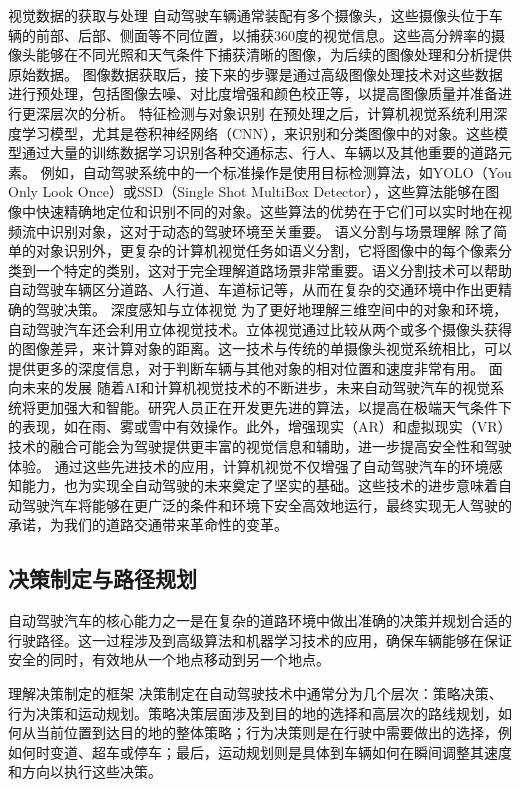 视觉数据的获取与处理
自动驾驶车辆通常装配有多个摄像头，这些摄像头位于车辆的前部、后部、侧面等不同位置，以捕获360度的视觉信息。这些高分辨率的摄像头能够在不同光照和天气条件下捕获清晰的图像，为后续的图像处理和分析提供原始数据。
图像数据获取后，接下来的步骤是通过高级图像处理技术对这些数据进行预处理，包括图像去噪、对比度增强和颜色校正等，以提高图像质量并准备进行更深层次的分析。
特征检测与对象识别
在预处理之后，计算机视觉系统利用深度学习模型，尤其是卷积神经网络（CNN），来识别和分类图像中的对象。这些模型通过大量的训练数据学习识别各种交通标志、行人、车辆以及其他重要的道路元素。
例如，自动驾驶系统中的一个标准操作是使用目标检测算法，如YOLO（You Only Look Once）或SSD（Single Shot MultiBox Detector），这些算法能够在图像中快速精确地定位和识别不同的对象。这些算法的优势在于它们可以实时地在视频流中识别对象，这对于动态的驾驶环境至关重要。
语义分割与场景理解
除了简单的对象识别外，更复杂的计算机视觉任务如语义分割，它将图像中的每个像素分类到一个特定的类别，这对于完全理解道路场景非常重要。语义分割技术可以帮助自动驾驶车辆区分道路、人行道、车道标记等，从而在复杂的交通环境中作出更精确的驾驶决策。
深度感知与立体视觉
为了更好地理解三维空间中的对象和环境，自动驾驶汽车还会利用立体视觉技术。立体视觉通过比较从两个或多个摄像头获得的图像差异，来计算对象的距离。这一技术与传统的单摄像头视觉系统相比，可以提供更多的深度信息，对于判断车辆与其他对象的相对位置和速度非常有用。
面向未来的发展
随着AI和计算机视觉技术的不断进步，未来自动驾驶汽车的视觉系统将更加强大和智能。研究人员正在开发更先进的算法，以提高在极端天气条件下的表现，如在雨、雾或雪中有效操作。此外，增强现实（AR）和虚拟现实（VR）技术的融合可能会为驾驶提供更丰富的视觉信息和辅助，进一步提高安全性和驾驶体验。
通过这些先进技术的应用，计算机视觉不仅增强了自动驾驶汽车的环境感知能力，也为实现全自动驾驶的未来奠定了坚实的基础。这些技术的进步意味着自动驾驶汽车将能够在更广泛的条件和环境下安全高效地运行，最终实现无人驾驶的承诺，为我们的道路交通带来革命性的变革。
\subsection{决策制定与路径规划}

自动驾驶汽车的核心能力之一是在复杂的道路环境中做出准确的决策并规划合适的行驶路径。这一过程涉及到高级算法和机器学习技术的应用，确保车辆能够在保证安全的同时，有效地从一个地点移动到另一个地点。

理解决策制定的框架
决策制定在自动驾驶技术中通常分为几个层次：策略决策、行为决策和运动规划。策略决策层面涉及到目的地的选择和高层次的路线规划，如何从当前位置到达目的地的整体策略；行为决策则是在行驶中需要做出的选择，例如何时变道、超车或停车；最后，运动规划则是具体到车辆如何在瞬间调整其速度和方向以执行这些决策。

